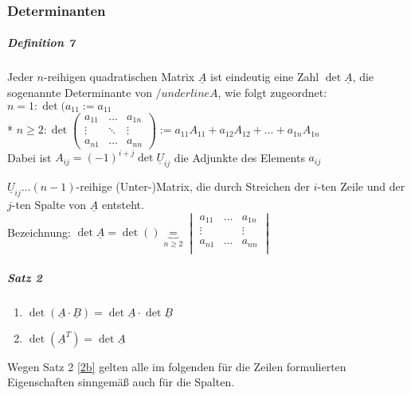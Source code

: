 \documentclass[a4paper]{scrartcl}
\begin{document}
\subsubsection{Determinanten}
\subparagraph{Definition 7} Jeder $n$-reihigen quadratischen Matrix $\underline{A}$ ist eindeutig eine Zahl $\det{\underline{A}}$, die sogenannte Determinante von $/underline{A}$, wie folgt zugeordnet:\\
$n=1 : \det(a_{11} := a_{11}$\\*
$n\geq 2: \det{ \begin{pmatrix}
a_{11} & \dots & a_{1n}\\
\vdots & \ddots & \vdots\\
a_{n1} & \dots & a_{nn} \end{pmatrix}} := a_{11} A_{11} + a_{12} A_{12} + ... + a_{1n}A_{1n}$\\
Dabei ist $A_{ij} = (-1)^{i+j} \det{\underline{U}_{ij}}$ die Adjunkte des Elements $a_{ij}$

$\underline{U}_{ij} \dots (n-1)$-reihige (Unter-)Matrix, die durch Streichen der $i$-ten Zeile und der $j$-ten Spalte von $\underline{A}$ entsteht.\\
Bezeichnung: $\det{\underline{A}} = \det{()} \underbrace{=}_{n\geq 2} \begin{vmatrix} a_{11} & \dots & a_{1n} \\ \vdots & & \vdots \\ a_{n1} & \dots & a_{nn} \\ \end{vmatrix}$

\subparagraph{Satz 2}
\begin{enumerate}
\item $\det{(\underline{A}\cdot \underline{B})} = \det{\underline{A}} \cdot \det{\underline{B}}$
\item \label{2b} $\det{(\underline{A}^T)} = \det{\underline{A}}$
\end{enumerate}
Wegen Satz 2 \ref{2b} gelten alle im folgenden für die Zeilen formulierten Eigenschaften sinngemäß auch für die Spalten.
\end{document}
